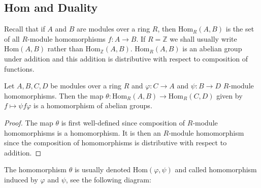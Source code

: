 \subsection{Hom and Duality}
Recall that if $A$ and $B$ are modules over a ring $R$, then $\mathrm{Hom}_R(A,B)$ is the set of all $R$-module homomorphisms $f:A\to B$. If $R=\mathbb{Z}$ we shall usually write $\mathrm{Hom}(A,B)$ rather than $\mathrm{Hom}_\mathbb{Z}(A,B)$. $\mathrm{Hom}_R(A,B)$ is an abelian group under addition and this addition is distributive with respect to composition of functions.
\begin{theorem}
Let $A,B,C,D$ be modules over a ring $R$ and $\varphi:C\to A$ and $\psi:B\to D$ $R$-module homomorphisms. Then the map $\theta:\mathrm{Hom}_R(A,B)\to\mathrm{Hom}_R(C,D)$ given by $f\mapsto\psi f\varphi$ is a homomorphism of abelian groups.
\end{theorem}
\begin{proof}
The map $\theta$ is first well-defined since composition of $R$-module homomorphisms is a homomorphism. It is then an $R$-module homomorphism since the composition of homomorphisms is distributive with respect to addition.
\end{proof}
The homomorphism $\theta$ is usually denoted $\mathrm{Hom}(\varphi,\psi)$ and called homomorphism induced by $\varphi$ and $\psi$, see the following diagram:
